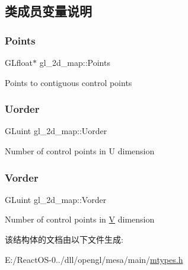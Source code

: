 \subsection{类成员变量说明}
\mbox{\label{structgl__2d__map_aca2aaf2e65c5b88f2161131fcae16c5e}} 
\subsubsection{\texorpdfstring{Points}{Points}}
{\footnotesize\ttfamily G\+Lfloat$\ast$ gl\+\_\+2d\+\_\+map\+::\+Points}

Points to contiguous control points \mbox{\label{structgl__2d__map_a39f647e98f9ea83e922a9915290ed418}} 
\subsubsection{\texorpdfstring{Uorder}{Uorder}}
{\footnotesize\ttfamily G\+Luint gl\+\_\+2d\+\_\+map\+::\+Uorder}

Number of control points in U dimension \mbox{\label{structgl__2d__map_a9f67d8b31aa1e8a6d96cd41977f9c6a8}} 
\subsubsection{\texorpdfstring{Vorder}{Vorder}}
{\footnotesize\ttfamily G\+Luint gl\+\_\+2d\+\_\+map\+::\+Vorder}

Number of control points in \hyperlink{struct_v}{V} dimension 

该结构体的文档由以下文件生成\+:\begin{DoxyCompactItemize}
\item 
E\+:/\+React\+O\+S-\/0../dll/opengl/mesa/main/\hyperlink{mtypes_8h}{mtypes.\+h}\end{DoxyCompactItemize}
